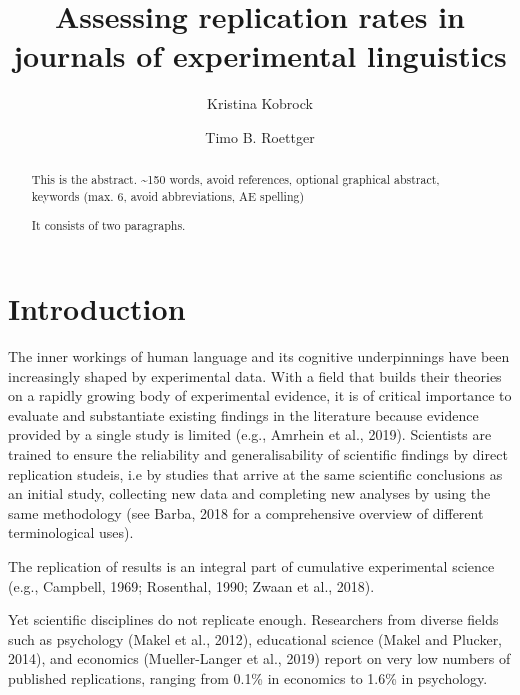 \documentclass[]{elsarticle} %
\begin{document}
\begin{frontmatter}

  \title{Assessing replication rates in journals of experimental linguistics}
    \author[University of Osnabrück]{Kristina Kobrock}
    \author[Universitetet i Oslo]{Timo B. Roettger}
  
      \address[University of Osnabrück]{Institute of Cognitive Science, Wachsbleiche 27, 49090 Osnabrück}
    \address[Universitetet i Oslo]{Department of Linguistics and Scandinavian Studies}
  
  \begin{abstract}
  This is the abstract. \textasciitilde150 words, avoid references, optional graphical abstract, keywords (max. 6, avoid abbreviations, AE spelling)

  It consists of two paragraphs.
  \end{abstract}
  
 \end{frontmatter}

\hypertarget{introduction}{%
\section{Introduction}\label{introduction}}

The inner workings of human language and its cognitive underpinnings have been increasingly shaped by experimental data. With a field that builds their theories on a rapidly growing body of experimental evidence, it is of critical importance to evaluate and substantiate existing findings in the literature because evidence provided by a single study is limited (e.g., Amrhein et al., 2019). Scientists are trained to ensure the reliability and generalisability of scientific findings by direct replication studeis, i.e by studies that arrive at the same scientific conclusions as an initial study, collecting new data and completing new analyses by using the same methodology (see Barba, 2018 for a comprehensive overview of different terminological uses).

The replication of results is an integral part of cumulative experimental science (e.g., Campbell, 1969; Rosenthal, 1990; Zwaan et al., 2018).

Yet scientific disciplines do not replicate enough. Researchers from diverse fields such as psychology (Makel et al., 2012), educational science (Makel and Plucker, 2014), and economics (Mueller-Langer et al., 2019) report on very low numbers of published replications, ranging from 0.1\% in economics to 1.6\% in psychology.
\end{document}

